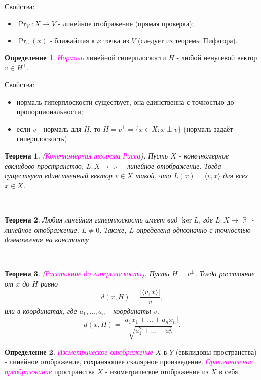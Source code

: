 \documentclass[a4paper,100pt]{article}
\theoremstyle{indented}
\newtheorem{theorem}{Теорема}
\theoremstyle{definition}
\newtheorem{defn}{Определение}
\theoremstyle{remark}
\DeclareMathOperator{\ra}{\rightarrow}
\DeclareMathOperator{\RR}{\mathbb{R}}
\begin{document}
Свойства:

\begin{itemize}
    \item $\Pr_V : X \ra V$ - линейное отображение (прямая проверка); 
    \item $\Pr_v(x)$ - ближайшая к $x$ точка из $V$ (следует из теоремы Пифагора). 
\end{itemize}

\begin{defn}
    \textit{\textcolor{magenta}{\hypertarget{s69}{Нормаль}}} линейной гиперплоскости $H$ - любой ненулевой вектор $v\in H^{\perp}$. 
\end{defn}

Свойства:

\begin{itemize}
    \item нормаль гиперплоскости существует, она единственна с точностью до пропорциональности; 
    \item если $v$ - нормаль для $H$, то $H = v^{\perp} = \{x \in X: x \perp v\}$ (нормаль задаёт гиперплоскость).
\end{itemize}

\begin{theorem}
    (\textit{\textcolor{magenta}{\hypertarget{s70}{Конечномерная теорема Рисса}}}). Пусть $X$ - конечномерное евклидово пространство, $L:X\ra \RR$ - линейное отображение. Тогда существует единственный вектор $v\in X$ такой, что $L(x)=\langle v, x \rangle$ для всех $x\in X$. 
\end{theorem} \

\begin{theorem}
    Любая линейная гиперплоскость имеет вид $\ker L$, где $L:X\ra \RR$ - линейное отображение, $L\neq 0$. Также, $L$ определена однозначно с точностью домножения на константу.
\end{theorem} \ 

\begin{theorem}
    (\textit{\textcolor{magenta}{\hypertarget{s71}{Расстояние до гиперплоскости}}}). Пусть $H=v^{\perp}$. Тогда расстояние от $x$ до $H$ равно 
    \[
        d(x, H)=\frac{|\langle v, x \rangle|}{|v|}, 
    \]
    или в координатах, где $a_1, \ldots, a_n$ - координаты $v$, 
    \[
        d(x, H)=\frac{|a_1x_1+\ldots+a_n x_n|}{\sqrt{a_1^2+\ldots+a_n^2}}.
    \]
\end{theorem}

\begin{defn}
    \textit{\textcolor{magenta}{\hypertarget{s72}{Изометрическое отображение}}} $X$ в $Y$ (евклидовы пространства) - линейное отображение, сохраняющее скалярное произведение. \textit{\textcolor{magenta}{\hypertarget{s73}{Ортогональное преобразование}}} пространства $X$ - изометрическое отображение из $X$ в себя.
\end{defn}
\end{document}
